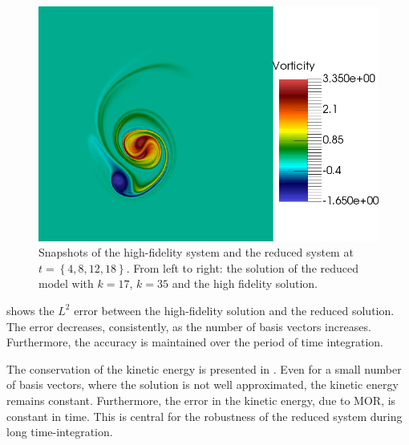 \begin{figure}[t]
\includegraphics[scale=0.06]{data/Incompressible_Euler/Snapshots/Full_5.png}

\caption{Snapshots of the high-fidelity system and the reduced system at $t=\left\{ 4,8,12,18 \right\}$. From left to right: the solution of the reduced model with $k=17$, $k=35$ and the high fidelity solution.}
\label{fig:snap_solution_incompressible_Euler}
\end{figure}


 shows the $L^2$ error between the high-fidelity solution and the reduced solution. The error decreases, consistently, as the number of basis vectors increases. Furthermore, the accuracy is maintained over the period of time integration.

The conservation of the kinetic energy is presented in . Even for a small number of basis vectors, where the solution is not well approximated, the kinetic energy remains constant. Furthermore, the error in the kinetic energy, due to MOR, is constant in time. This is central for the robustness of the reduced system during long time-integration.


